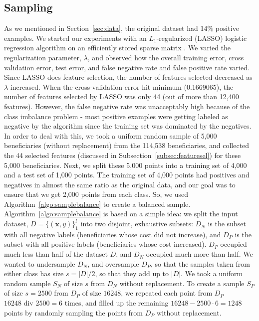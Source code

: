 \subsection{Sampling}
\label{subsec:sampling}
As we mentioned in Section~\ref{sec:data}, the original dataset had 14\% positive examples. We started our experiments with an $L_1$-regularized (LASSO) logistic regression algorithm \cite{glmnet} on an efficiently stored sparse matrix \cite{matrix}. We varied the regularization parameter, $\lambda$, and observed how the overall training error, cross validation error, test error, and false negative rate and false positive rate varied. Since LASSO does feature selection, the number of features selected decreased as $\lambda$ increased. When the cross-validation error hit minimum (0.1669065), the number of features selected by LASSO was only 44 (out of more than 12,400 features). However, the false negative rate was unacceptably high because of the class imbalance problem - most positive examples were getting labeled as negative by the algorithm since the training set was dominated by the negatives.\\

In order to deal with this, we took a uniform random sample of 5,000 beneficiaries (without replacement) from the 114,538 beneficiaries, and collected the 44 selected features (discussed in Subsection~\ref{subsec:featuresel}) for these 5,000 beneficiaries. Next, we split these 5,000 points into a training set of 4,000 and a test set of 1,000 points. The training set of 4,000 points had positives and negatives in almost the same ratio as the original data, and our goal was to ensure that we get 2,000 points from each class. So, we used Algorithm~\ref{algo:samplebalance} to create a balanced sample.\\

Algorithm~\ref{algo:samplebalance} is based on a simple idea: we split the input dataset, $D = \{(\mathbf{x}, y)\}_1^l$ into two disjoint, exhaustive subsets: $D_N$ is the subset with all negative labels (beneficiaries whose cost did not increase), and $D_P$ is the subset with all positive labels (beneficiaries whose cost increased). $D_P$ occupied much less than half of the dataset $D$, and $D_N$ occupied much more than half. We wanted to undersample $D_N$, and oversample $D_P$, so that the samples taken from either class has size $s = |D|/2$, so that they add up to $|D|$. We took a uniform random sample $S_N$ of size $s$ from $D_N$ without replacement. To create a sample $S_P$ of size $s = 2500$ from $D_P$ of size $16248$, we repeated each point from $D_P$ $16248 \mbox{ div } 2500 = 6$ times, and filled up the remaining $16248 - 2500{\cdot}6 = 1248$ points by randomly sampling the points from $D_P$ without replacement.


